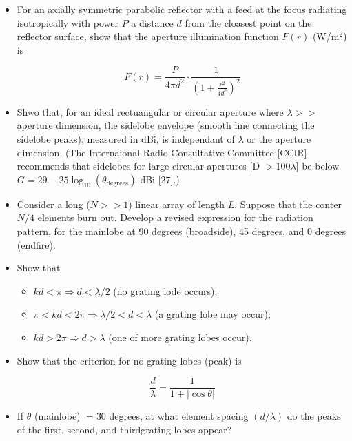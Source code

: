 \documentclass[letterpaper,10pt]{article}\usepackage[]{graphicx}\usepackage[]{color}
\newcommand{\question}[3]{
\begin{itemize}
\item[{\makebox[1cm]{#1)}}] #2

\vspace{.2in}

#3

\end{itemize}

\vspace{.2in}
}
\begin{document}
\question{2.14}{
For an axially symmetric parabolic reflector with a feed at the focus radiating isotropically with power $P$ a distance $d$ from the cloasest point on the reflector surface, show that the aperture illumination function $F(r)$ (W/m$^2$) is

\begin{equation*}
F(r) = \frac{P}{4\pi d^2}\cdot\frac{1}{\left(1+\frac{r^2}{4d^2}\right)^2}
\end{equation*}
}{}

\question{2.15}{
Shwo that, for an ideal rectuangular or circular aperture where $\lambda >>$ aperture dimension, the sidelobe envelope (smooth line connecting the sidelobe peaks), measured in dBi, is independant of $\lambda$ or the aperture dimension.  (The Internaional Radio Consultative Committee [CCIR] recommends that sidelobes for large circular apertures [D $> 100\lambda$] be below $G=29-25\log_{10}(\theta_\text{degrees})$ dBi [27].)
}{}

\question{2.16}{
Consider a long ($N >> 1$) linear array of length $L$.  Suppose that the conter $N/4$ elements burn out.  Develop a revised expression for the radiation pattern, for the mainlobe at 90 degrees (broadside), 45 degrees, and 0 degrees (endfire).
}{}

\question{2.17}{
Show that 


\begin{itemize}
\renewcommand{\labelitemi}{$\bullet$}
\item $kd < \pi \Rightarrow d < \lambda / 2$ (no grating lode occurs);
\item $\pi < kd < 2\pi \Rightarrow \lambda / 2 < d < \lambda$ (a grating lobe may occur);
\item $kd > 2\pi\Rightarrow d> \lambda$ (one of more grating lobes occur).
\end{itemize}

}{}

\question{2.18}{
Show that the criterion for no grating lobes (peak) is

\begin{equation*}
\frac{d}{\lambda}=\frac{1}{1+|\cos\theta|}
\end{equation*}

}{}

\question{2.19}{
If $\theta$ (mainlobe) $=30$ degrees, at what element spacing $(d/\lambda)$ do the peaks of the first, second, and thirdgrating lobes appear?
}{}
\end{document}
